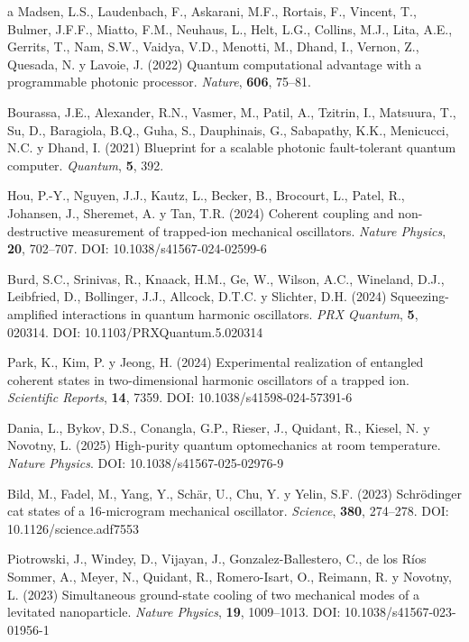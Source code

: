 \documentclass[11pt,a4paper,spanish]{book}
\begin{document}
\begin{thebibliography}{a}
 Madsen, L.S., Laudenbach, F., Askarani, M.F., Rortais, F., Vincent, T., Bulmer, J.F.F., Miatto, F.M., Neuhaus, L., Helt, L.G., Collins, M.J., Lita, A.E., Gerrits, T., Nam, S.W., Vaidya, V.D., Menotti, M., Dhand, I., Vernon, Z., Quesada, N. y Lavoie, J. (2022) Quantum computational advantage with a programmable photonic processor. \textit{Nature}, \textbf{606}, 75--81.

 Bourassa, J.E., Alexander, R.N., Vasmer, M., Patil, A., Tzitrin, I., Matsuura, T., Su, D., Baragiola, B.Q., Guha, S., Dauphinais, G., Sabapathy, K.K., Menicucci, N.C. y Dhand, I. (2021) Blueprint for a scalable photonic fault-tolerant quantum computer. \textit{Quantum}, \textbf{5}, 392.


 Hou, P.-Y., Nguyen, J.J., Kautz, L., Becker, B., Brocourt, L., Patel, R., Johansen, J., Sheremet, A. y Tan, T.R. (2024) Coherent coupling and non-destructive measurement of trapped-ion mechanical oscillators. \textit{Nature Physics}, \textbf{20}, 702--707. DOI: 10.1038/s41567-024-02599-6

 Burd, S.C., Srinivas, R., Knaack, H.M., Ge, W., Wilson, A.C., Wineland, D.J., Leibfried, D., Bollinger, J.J., Allcock, D.T.C. y Slichter, D.H. (2024) Squeezing-amplified interactions in quantum harmonic oscillators. \textit{PRX Quantum}, \textbf{5}, 020314. DOI: 10.1103/PRXQuantum.5.020314

 Park, K., Kim, P. y Jeong, H. (2024) Experimental realization of entangled coherent states in two-dimensional harmonic oscillators of a trapped ion. \textit{Scientific Reports}, \textbf{14}, 7359. DOI: 10.1038/s41598-024-57391-6

 Dania, L., Bykov, D.S., Conangla, G.P., Rieser, J., Quidant, R., Kiesel, N. y Novotny, L. (2025) High-purity quantum optomechanics at room temperature. \textit{Nature Physics}. DOI: 10.1038/s41567-025-02976-9

 Bild, M., Fadel, M., Yang, Y., Schär, U., Chu, Y. y Yelin, S.F. (2023) Schrödinger cat states of a 16-microgram mechanical oscillator. \textit{Science}, \textbf{380}, 274--278. DOI: 10.1126/science.adf7553

 Piotrowski, J., Windey, D., Vijayan, J., Gonzalez-Ballestero, C., de los Ríos Sommer, A., Meyer, N., Quidant, R., Romero-Isart, O., Reimann, R. y Novotny, L. (2023) Simultaneous ground-state cooling of two mechanical modes of a levitated nanoparticle. \textit{Nature Physics}, \textbf{19}, 1009--1013. DOI: 10.1038/s41567-023-01956-1


\end{thebibliography}
\end{document}
